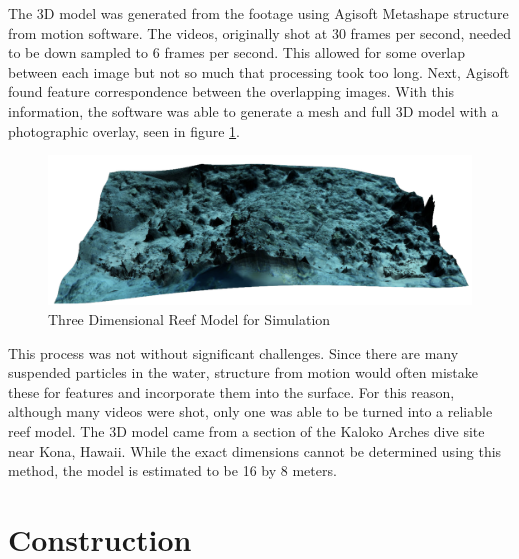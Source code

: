 The 3D model was generated from the footage using Agisoft Metashape structure from motion software. The videos, originally shot at 30 frames per second, needed to be down sampled to 6 frames per second. This allowed for some overlap between each image but not so much that processing took too long. Next, Agisoft found feature correspondence between the overlapping images. With this information, the software was able to generate a mesh and full 3D model with a photographic overlay, seen in figure \ref{reef}. 

\begin{figure}[h]
\includegraphics[width=\maxwidth{\textwidth}]{img/reef.png}
\caption{Three Dimensional Reef Model for Simulation}
\label{reef}
\end{figure}

This process was not without significant challenges. Since there are many suspended particles in the water, structure from motion would often mistake these for features and incorporate them into the surface. For this reason, although many videos were shot, only one was able to be turned into a reliable reef model. The 3D model came from a section of the Kaloko Arches dive site near Kona, Hawaii. While the exact dimensions cannot be determined using this method, the model is estimated to be 16 by 8 meters.




\section{Construction}


